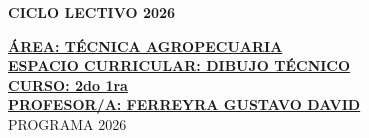 \documentclass[a4paper,landscape]{article}
\begin{document}

\begin{center}
\fontsize{12pt}{14pt}\selectfont\bfseries CICLO LECTIVO 2026
\end{center}

\vspace{0.5cm}
\noindent\textbf{\underline{ÁREA: TÉCNICA AGROPECUARIA}}\\
\noindent\textbf{\underline{ESPACIO CURRICULAR: DIBUJO TÉCNICO}}\\
\noindent\textbf{\underline{CURSO: 2do 1ra}}\\
\noindent\textbf{\underline{PROFESOR/A: FERREYRA GUSTAVO DAVID}}\\
\noindent PROGRAMA 2026

\vspace{0.5cm}
\end{document}
